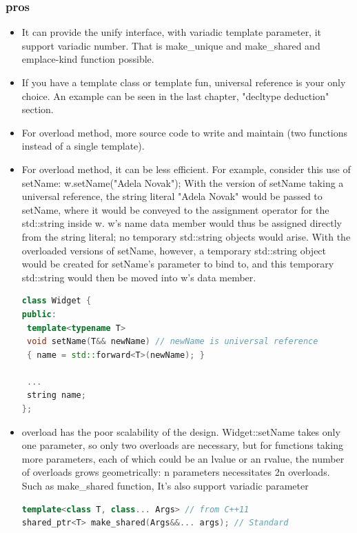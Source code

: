 \documentclass[a4paper,12pt,twoside]{book}
\begin{document}
\subsubsection{pros}
\begin{itemize}
\item It can provide the unify interface, with variadic template parameter, it support variadic number. That is make\_unique and make\_shared and emplace-kind function possible.

\item If you have a template class or template fun, universal reference is your only choice. An example can be seen in the last chapter, "decltype deduction" section.

\item For overload method, more source code to write and maintain (two functions instead of a single template). 

\item For overload method, it can be less efficient. For example, consider this use of setName: w.setName("Adela Novak"); With the version of setName taking a universal reference, the string literal "Adela Novak" would be passed to setName, where it would be conveyed to the assignment operator for the std::string inside w. w's name data member would thus be assigned directly from the string literal; no temporary std::string objects would arise. With the overloaded versions of setName, however, a temporary std::string object
would be created for setName's parameter to bind to, and this temporary std::string would then be moved into w's data member.

\begin{lstlisting}[frame=single, language=c++]
class Widget {
public:
 template<typename T>
 void setName(T&& newName) // newName is universal reference
 { name = std::forward<T>(newName); }
 
 ... 
 string name;    
};

\end{lstlisting}


\item overload has the poor scalability of the design. Widget::setName takes only one parameter, so only two overloads are necessary, but for functions taking more parameters, each of which could be an lvalue or an rvalue, the number of overloads grows geometrically: n parameters necessitates 2n overloads. Such as make\_shared function, It's also support variadic parameter

\begin{lstlisting}[frame=single, language=c++]
template<class T, class... Args> // from C++11
shared_ptr<T> make_shared(Args&&... args); // Standard


\end{lstlisting}
\end{itemize}
\end{document}
